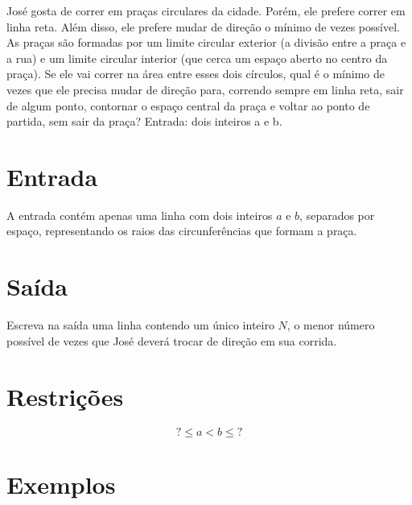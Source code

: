 José gosta de correr em praças circulares da cidade. Porém, ele prefere correr em linha reta. Além disso, ele prefere mudar de direção o mínimo de vezes possível. As praças são formadas por um limite circular exterior (a divisão entre a praça e a rua) e um limite circular interior (que cerca um espaço aberto no centro da praça). Se ele vai correr na área entre esses dois círculos, qual é o mínimo de vezes que ele precisa mudar de direção para, correndo sempre em linha reta, sair de algum ponto, contornar o espaço central da praça e voltar ao ponto de partida, sem sair da praça? Entrada: dois inteiros a e b.

\section*{Entrada}

A entrada contém apenas uma linha com dois inteiros $a$ e $b$, separados por espaço, representando os raios das circunferências que formam a praça.

\section*{Saída}

Escreva na saída uma linha contendo um único inteiro $N$, o menor número possível de vezes que José deverá trocar de direção em sua corrida.

\section*{Restrições}

$$? \leq a < b \leq ?$$

\section*{Exemplos}
\exemplo
